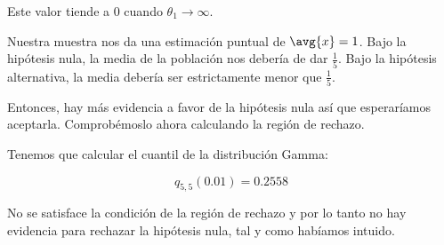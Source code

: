 \begin{problem}[1]
Este valor tiende a 0 cuando $θ_1\to∞$.

\spart Nuestra muestra nos da una estimación puntual de $\avg{x} = 1$. Bajo la hipótesis nula, la media de la población nos debería de dar $\frac{1}{5}$. Bajo la hipótesis alternativa, la media debería ser estrictamente menor que $\frac{1}{5}$.

Entonces, hay más evidencia a favor de la hipótesis nula así que esperaríamos aceptarla. Comprobémoslo ahora calculando la región de rechazo.

Tenemos que calcular el cuantil de la distribución Gamma:

\[ q_{5,5}(0.01) = 0.2558 \]

No se satisface la condición de la región de rechazo y por lo tanto no hay evidencia para rechazar la hipótesis nula, tal y como habíamos intuido.
\end{problem}
